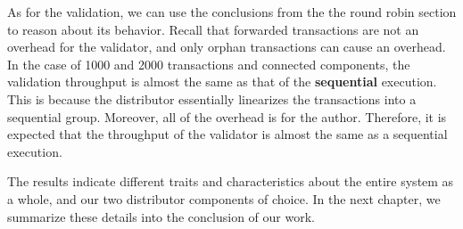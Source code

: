\begin{itemize}
	As for the validation, we can use the conclusions from the the round robin section to reason about its
	behavior. Recall that forwarded transactions are not an overhead for the validator, and only
	orphan transactions can cause an overhead. In the case of 1000 and 2000 transactions and
	connected components, the validation throughput is almost the same as that of the \textbf{sequential}
	execution. This is because the distributor essentially linearizes the transactions into a
	sequential group. Moreover, all of the overhead is for the author. Therefore, it is expected
	that the throughput of the validator is almost the same as a sequential execution.
\end{itemize}

The results indicate different traits and characteristics about the entire system as a whole, and
our two distributor components of choice. In the next chapter, we summarize these details into the
conclusion of our work.


